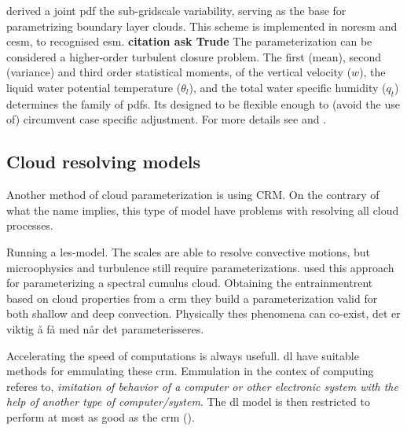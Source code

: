 \cite{Golaz2002_part1} derived a joint \acrshort{pdf} the sub-gridscale variability, serving as the base for parametrizing boundary layer clouds. This scheme is implemented in \acrfull{noresm} and \acrfull{cesm}, to recognised \acrshort{esm}. \textbf{citation ask Trude} The parameterization can be considered a higher-order turbulent closure problem. The first (mean), second (variance) and third order statistical moments, of the vertical velocity ($w$), the liquid water potential temperature ($\theta_l$), and the total water specific humidity ($q_t$) determines the family of \acrshort{pdf}s. Its designed to be flexible enough to (avoid the use of) circumvent case specific adjustment. For more details see \cite{Golaz2002_part1} and \cite{Golaz2002_part2}.

\subsection{Cloud resolving models} \label{sec:params_climate_models}
Another method of cloud parameterization is using \acrshort{CRM}. On the contrary of what the name implies, this type of model have problems with resolving all cloud processes. 

Running a \acrfull{les}-model. The scales are able to resolve convective motions, but microophysics and turbulence still require parameterizations. \cite{Baba2019SpectralModel} used this approach for parameterizing a spectral cumulus cloud. Obtaining the entrainmentrent based on cloud properties from a \acrshort{crm} they build a parameterization valid for both shallow and deep convection. Physically thes phenomena can co-exist, det er viktig å få med når det parameterisseres. 

Accelerating the speed of computations is always usefull. \acrshort{dl} have suitable methods for emmulating these \acrshort{crm}. Emmulation in the contex of computing referes to, \textit{imitation of behavior of a computer or other electronic system with the help of another type of computer/system}. The \acrshort{dl} model is then restricted to perform at most as good as the \acrshort{crm} (\cite{Rasp2018DeepModels}).